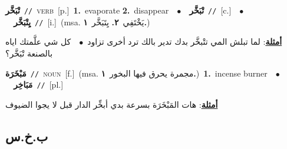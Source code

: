 \documentclass[10pt,a4paper,twoside]{article} %
\begin{document}
\begin{multicols}{2}
{\setlength\topsep{0pt}\textbf{\foreignlanguage{arabic}{تْبَخَّر}}\ {\color{gray}\texttt{//}\color{black}}\ \textsc{verb}\ [p.]\ \textbf{1.}~evaporate  \textbf{2.}~disappear\ \ $\bullet$\ \ \setlength\topsep{0pt}\textbf{\foreignlanguage{arabic}{تْبَخَّر}}\ {\color{gray}\texttt{//}\color{black}}\ [c.]\ \ $\bullet$\ \ \setlength\topsep{0pt}\textbf{\foreignlanguage{arabic}{يِتْبَخَّر}}\ {\color{gray}\texttt{//}\color{black}}\ [i.]\ \color{gray}(msa. \foreignlanguage{arabic}{يَخْتَفِي}~\foreignlanguage{arabic}{\textbf{٢.}}  \foreignlanguage{arabic}{يِتَبَخَّر}~\foreignlanguage{arabic}{\textbf{١.}})\color{black}\  \begin{flushright}\color{gray}\foreignlanguage{arabic}{\textbf{\underline{\foreignlanguage{arabic}{أمثلة}}}: لما تبلش المي تتْبخَّر بدك تدير بالك ترد أخرى تزاود\ $\bullet$\ \  كل شي علَّمتك اياه بالصنعة تْبَخَّر؟}\end{flushright}\color{black}} \vspace{2mm}

{\setlength\topsep{0pt}\textbf{\foreignlanguage{arabic}{مَبْخَرَة}}\ {\color{gray}\texttt{//}\color{black}}\ \textsc{noun}\ [f.]\ \color{gray}(msa. \foreignlanguage{arabic}{مجمرة يحرق فيها البخور}~\foreignlanguage{arabic}{\textbf{١.}})\color{black}\ \textbf{1.}~incense burner\ \ $\bullet$\ \ \setlength\topsep{0pt}\textbf{\foreignlanguage{arabic}{مَبَاخِر}}\ {\color{gray}\texttt{//}\color{black}}\ [pl.]\  \begin{flushright}\color{gray}\foreignlanguage{arabic}{\textbf{\underline{\foreignlanguage{arabic}{أمثلة}}}: هات المَبْخَرَة بسرعة بدي أبخِّر الدار قبل لا يجوا الضيوف}\end{flushright}\color{black}} \vspace{2mm}

\vspace{-3mm}
\subsection*{\color{blue}\foreignlanguage{arabic}{ب.خ.س}\color{blue}{}} 


\end{multicols}
\end{document}
